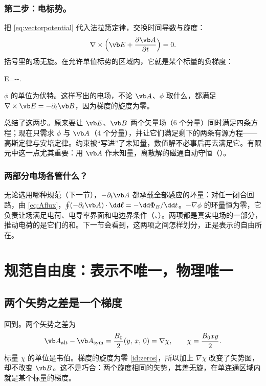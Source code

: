 \subsubsection{第二步：电标势。} 把 \eqref{eq:vectorpotential} 代入法拉第定律，交换时间导数与旋度：
\begin{equation}
\nabla\times\Bigl(\vb E+\frac{\partial\vb A}{\partial t}\Bigr)=0 .
\end{equation}
括号里的场无旋。在允许单值标势的区域内，它就是某个标量的负梯度：
\begin{keyeq}
\vb E=--\nabla\phi .
\label{eq:Etwopotentials}
\end{keyeq}
$\phi$ 的单位为伏特。这样写出的电场，不论 $\vb A$、$\phi$ 取什么，都满足 $\nabla\times\vb E=-\partial_t\vb B$，因为梯度的旋度为零。

 总结了这两步。原来要让 $\vb E$、$\vb B$ 两个矢量场（6 个分量）同时满足四条方程；现在只需求 $\phi$ 与 $\vb A$（4 个分量），并让它们满足剩下的两条有源方程——高斯定律与安培定律。约束被“写进”了未知量，数值解不必事后再去满足它。有限元中这一点尤其重要：用 $\vb A$ 作未知量，离散解的磁通自动守恒（）。


\subsubsection{两部分电场各管什么？} 无论选用哪种规范（下一节），$-\partial_t\vb A$ 都承载全部感应的环量：对任一闭合回路，由 \eqref{eq:Aflux}，$\oint(-\partial_t\vb A)\cdot\dd\boldsymbol\ell=-\dd\Phi_B/\dd t$。$-\nabla\phi$ 的环量恒为零，它负责让场满足电荷、电导率界面和电边界条件（、）。两项都是真实电场的一部分，推动电荷的是它们的和。下一节会看到，这两项之间怎样划分，正是表示的自由所在。

\section{规范自由度：表示不唯一，物理唯一}\label{sec:potentials-gauge}

\subsection{两个矢势之差是一个梯度}
回到。两个矢势之差为
\begin{equation}
\vb A_{\rm alt}-\vb A_{\rm sym}=\frac{B_0}{2}(y,\,x,\,0)=\nabla\chi,\qquad \chi=\frac{B_0xy}{2}.
\end{equation}
标量 $\chi$ 的单位是韦伯。梯度的旋度为零 \eqref{id:zeros}，所以加上 $\nabla\chi$ 改变了矢势图，却不改变 $\vb B$。这不是巧合：两个旋度相同的矢势，其差无旋，在单连通区域内就是某个标量的梯度。

